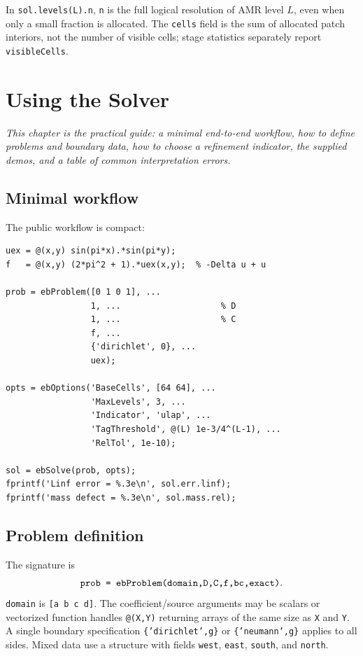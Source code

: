 \documentclass[11pt,oneside,openany]{book}
\newcommand{\code}[1]{\textnormal{\texttt{#1}}}
\begin{document}
\begin{cautionbox}
In \code{sol.levels(L).n}, \code{n} is the full logical resolution of AMR level $L$, even when only a small fraction is allocated. The \code{cells} field is the sum of allocated patch interiors, not the number of visible cells; stage statistics separately report \code{visibleCells}.
\end{cautionbox}

\chapter{Using the Solver}
\label{chap:userguide}

\emph{This chapter is the practical guide: a minimal end-to-end workflow, how to define problems and boundary data, how to choose a refinement indicator, the supplied demos, and a table of common interpretation errors.}

\section{Minimal workflow}
The public workflow is compact:

\begin{lstlisting}[caption={Minimal manufactured-solution workflow.},label={lst:minimal}]
uex = @(x,y) sin(pi*x).*sin(pi*y);
f   = @(x,y) (2*pi^2 + 1).*uex(x,y);  % -Delta u + u

prob = ebProblem([0 1 0 1], ...
                 1, ...                    % D
                 1, ...                    % C
                 f, ...
                 {'dirichlet', 0}, ...
                 uex);

opts = ebOptions('BaseCells', [64 64], ...
                 'MaxLevels', 3, ...
                 'Indicator', 'ulap', ...
                 'TagThreshold', @(L) 1e-3/4^(L-1), ...
                 'RelTol', 1e-10);

sol = ebSolve(prob, opts);
fprintf('Linf error = %.3e\n', sol.err.linf);
fprintf('mass defect = %.3e\n', sol.mass.rel);
\end{lstlisting}

\section{Problem definition}
The signature is
\[
 \code{prob = ebProblem(domain,D,C,f,bc,exact)}.
\]
\code{domain} is \code{[a b c d]}. The coefficient/source arguments may be scalars or vectorized function handles \code{@(X,Y)} returning arrays of the same size as \code{X} and \code{Y}. A single boundary specification \code{\{'dirichlet',g\}} or \code{\{'neumann',g\}} applies to all sides. Mixed data use a structure with fields \code{west}, \code{east}, \code{south}, and \code{north}.
\end{document}
